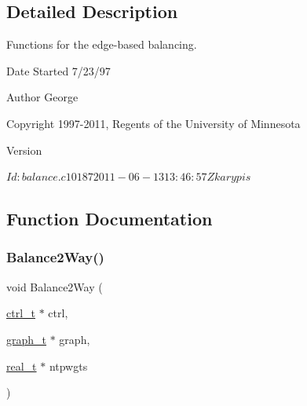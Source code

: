 \subsection{Detailed Description}
Functions for the edge-\/based balancing. 

\begin{DoxyDate}{Date}
Started 7/23/97 
\end{DoxyDate}
\begin{DoxyAuthor}{Author}
George 

Copyright 1997-\/2011, Regents of the University of Minnesota 
\end{DoxyAuthor}
\begin{DoxyVersion}{Version}
\begin{DoxyVerb}$Id: balance.c 10187 2011-06-13 13:46:57Z karypis $ \end{DoxyVerb}
 
\end{DoxyVersion}


\subsection{Function Documentation}
\mbox{\label{a00173_a11bd5be7764194a2bb8d6cfe580a30b8}} 
\subsubsection{\texorpdfstring{Balance2\+Way()}{Balance2Way()}}
{\footnotesize\ttfamily void Balance2\+Way (\begin{DoxyParamCaption}\item[{\hyperlink{a00742}{ctrl\+\_\+t} $\ast$}]{ctrl,  }\item[{\hyperlink{a00734}{graph\+\_\+t} $\ast$}]{graph,  }\item[{\hyperlink{a00876_a1924a4f6907cc3833213aba1f07fcbe9}{real\+\_\+t} $\ast$}]{ntpwgts }\end{DoxyParamCaption})}

